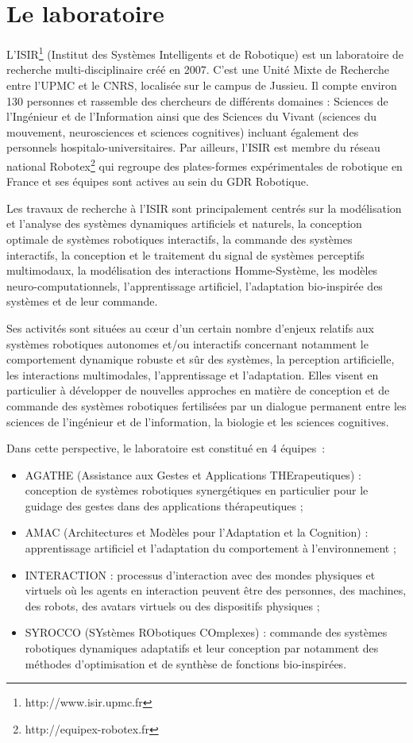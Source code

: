 \documentclass[draft]{llncs}
\begin{document}
\section{Le laboratoire}

\lettrine{L}{'ISIR}\footnote{http://www.isir.upmc.fr} (Institut des Systèmes Intelligents et de Robotique) est un laboratoire de recherche multi-disciplinaire créé en 2007.
C'est une Unité Mixte de Recherche entre l'UPMC et le CNRS, localisée sur le campus de Jussieu.
Il compte environ 130 personnes et rassemble des chercheurs de différents domaines : Sciences de l’Ingénieur et de l’Information ainsi que des Sciences du Vivant (sciences du mouvement, neurosciences et sciences cognitives) incluant également des personnels hospitalo-universitaires.
Par ailleurs, l'ISIR est membre du réseau national Robotex\footnote{http://equipex-robotex.fr} qui regroupe des plates-formes expérimentales de robotique en France et ses équipes sont actives au sein du GDR Robotique.

Les travaux de recherche à l'ISIR sont principalement centrés sur la modélisation et l'analyse des systèmes dynamiques artificiels et naturels, la conception optimale de systèmes robotiques interactifs, la commande des systèmes interactifs, la conception et le traitement du signal de systèmes perceptifs multimodaux, la modélisation des interactions Homme-Système, les modèles neuro-computationnels, l'apprentissage artificiel, l'adaptation bio-inspirée des systèmes et de leur commande. 

Ses activités sont situées au cœur d’un certain nombre d’enjeux relatifs aux systèmes robotiques autonomes et/ou interactifs concernant notamment le comportement dynamique robuste et sûr des systèmes, la perception artificielle, les interactions multimodales, l’apprentissage et l’adaptation.
Elles visent en particulier à développer de nouvelles approches en matière de conception et de commande des systèmes robotiques fertilisées par un dialogue permanent entre les sciences de l’ingénieur et de l’information, la biologie et les sciences cognitives.

Dans cette perspective, le laboratoire est constitué en 4 équipes~:

\begin{itemize}
\item AGATHE (Assistance aux Gestes et Applications THErapeutiques) : conception de systèmes robotiques synergétiques en particulier pour le guidage des gestes dans des applications thérapeutiques ;
\item AMAC (Architectures et Modèles pour l'Adaptation et la Cognition) : apprentissage artificiel et l’adaptation du comportement à l’environnement ;
\item INTERACTION : processus d’interaction avec des mondes physiques et virtuels où les agents en interaction peuvent être des personnes, des machines, des robots, des avatars virtuels ou des dispositifs physiques ;
\item SYROCCO (SYstèmes RObotiques COmplexes) : commande des systèmes robotiques dynamiques adaptatifs et leur conception par notamment des méthodes d’optimisation et de synthèse de fonctions bio-inspirées.
\end{itemize}
\end{document}
